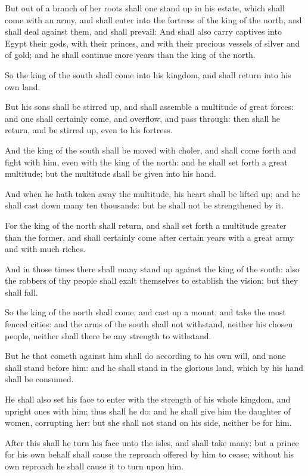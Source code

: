 \Verse But out of a branch of her roots shall one stand up in his estate, which shall come with an army, and shall enter into the fortress of the king of the north, and shall deal against them, and shall prevail: \Verse And shall also carry captives into Egypt their gods, with their princes, and with their precious vessels of silver and of gold; and he shall continue more years than the king of the north.

\Verse So the king of the south shall come into his kingdom, and shall return into his own land.

\Verse But his sons shall be stirred up, and shall assemble a multitude of great forces: and one shall certainly come, and overflow, and pass through: then shall he return, and be stirred up, even to his fortress.

\Verse And the king of the south shall be moved with choler, and shall come forth and fight with him, even with the king of the north: and he shall set forth a great multitude; but the multitude shall be given into his hand.

\Verse And when he hath taken away the multitude, his heart shall be lifted up; and he shall cast down many ten thousands: but he shall not be strengthened by it.

\Verse For the king of the north shall return, and shall set forth a multitude greater than the former, and shall certainly come after certain years with a great army and with much riches.

\Verse And in those times there shall many stand up against the king of the south: also the robbers of thy people shall exalt themselves to establish the vision; but they shall fall.

\Verse So the king of the north shall come, and cast up a mount, and take the most fenced cities: and the arms of the south shall not withstand, neither his chosen people, neither shall there be any strength to withstand.

\Verse But he that cometh against him shall do according to his own will, and none shall stand before him: and he shall stand in the glorious land, which by his hand shall be consumed.

\Verse He shall also set his face to enter with the strength of his whole kingdom, and upright ones with him; thus shall he do: and he shall give him the daughter of women, corrupting her: but she shall not stand on his side, neither be for him.

\Verse After this shall he turn his face unto the isles, and shall take many: but a prince for his own behalf shall cause the reproach offered by him to cease; without his own reproach he shall cause it to turn upon him.

